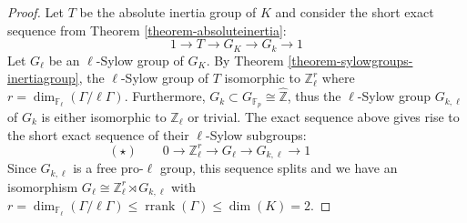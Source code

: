 \begin{proof}
Let $T$ be the absolute inertia group of $K$ and consider the short exact sequence from Theorem \ref{theorem-absoluteinertia}:
\[ 1\longrightarrow T\longrightarrow G_K\longrightarrow G_k\longrightarrow 1 \]
Let $G_\ell$ be an $\ell$-Sylow group of $G_K$. By Theorem \ref{theorem-sylowgroups-inertiagroup}, the $\ell$-Sylow group of $T$ isomorphic to $\mathbb{Z}_\ell^r$ where $r =\dim_{\mathbb{F}_\ell}(\Gamma/\ell\Gamma)$. Furthermore, $G_k\subset G_{\mathbb{F}_p}\cong\widehat{\mathbb{Z}}$, thus the $\ell$-Sylow group $G_{k,\ell}$ of $G_k$ is either isomorphic to $\mathbb{Z}_\ell$ or trivial. The exact sequence above gives rise to the short exact sequence of their $\ell$-Sylow subgroups:
\[ (\star)\qquad 0\longrightarrow\mathbb{Z}_\ell^r \longrightarrow G_\ell \longrightarrow G_{k,\ell}\longrightarrow 1 \phantom{\qquad (\star)} \]
Since $G_{k,\ell}$ is a free pro-$\ell$ group, this sequence splits and we have an isomorphism $G_\ell \cong \mathbb{Z}_\ell^r\rtimes G_{k,\ell}$ with $r =\dim_{\mathbb{F}_\ell}(\Gamma/\ell\Gamma)\leq \operatorname{rrank}(\Gamma)\leq \dim(K)= 2$.


\end{proof}
